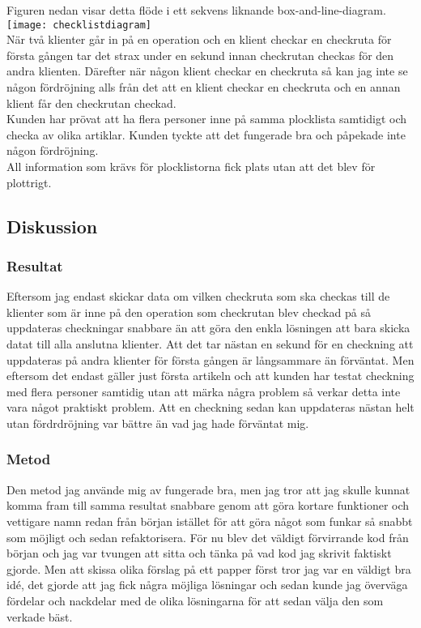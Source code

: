 Figuren nedan visar detta flöde i ett sekvens liknande box-and-line-diagram.
\texttt{[image: checklistdiagram]}\\

När två klienter går in på en operation och en klient checkar en checkruta för första gången tar det strax under en sekund innan checkrutan checkas för den andra klienten. Därefter när någon klient checkar en checkruta så kan jag inte se någon fördröjning alls från det att en klient checkar en checkruta och en annan klient får den checkrutan checkad.\\

Kunden har prövat att ha flera personer inne på samma plocklista samtidigt och checka av olika artiklar. Kunden tyckte att det fungerade bra och påpekade inte någon fördröjning. \\

All information som krävs för plocklistorna fick plats utan att det blev för plottrigt.

\subsection{Diskussion}
\subsubsection{Resultat}
Eftersom jag endast skickar data om vilken checkruta som ska checkas till de klienter som är inne på den operation som checkrutan blev checkad på så uppdateras checkningar snabbare än att göra den enkla lösningen att bara skicka datat till alla anslutna klienter. Att det tar nästan en sekund för en checkning att uppdateras på andra klienter för första gången är långsammare än förväntat. Men eftersom det endast gäller just första artikeln och att kunden har testat checkning med flera personer samtidig utan att märka några problem så verkar detta inte vara något praktiskt problem. Att en checkning sedan kan uppdateras nästan helt utan fördrdröjning var bättre än vad jag hade förväntat mig.

\subsubsection{Metod}
Den metod jag använde mig av fungerade bra, men jag tror att jag skulle kunnat komma fram till samma resultat snabbare genom att göra kortare funktioner och vettigare namn redan från början istället för att göra något som funkar så snabbt som möjligt och sedan refaktorisera. För nu blev det väldigt förvirrande kod från början och jag var tvungen att sitta och tänka på vad kod jag skrivit faktiskt gjorde. Men att skissa olika förslag på ett papper först tror jag var en väldigt bra idé, det gjorde att jag fick några möjliga lösningar och sedan kunde jag överväga fördelar och nackdelar med de olika lösningarna för att sedan välja den som verkade bäst.

